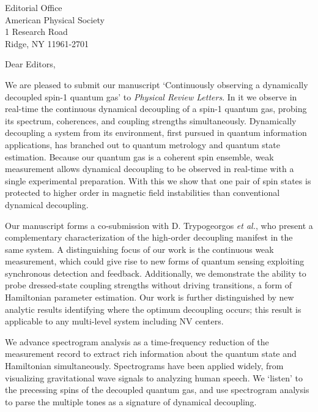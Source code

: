 \documentclass[10pt,letterpaper]{letter} %
\begin{document}
\begin{letter}{
    Editorial Office\\
    American Physical Society\\
    1 Research Road \\
    Ridge, NY 11961-2701\\
}

\opening{Dear Editors,}

We are pleased to submit our manuscript `Continuously observing a dynamically decoupled spin-1 quantum gas' to \textit{Physical Review Letters}.
In it we observe in real-time the continuous dynamical decoupling of a spin-1 quantum gas, probing its spectrum, coherences, and coupling strengths simultaneously.
Dynamically decoupling a system from its environment, first pursued in quantum information applications, has branched out to quantum metrology and quantum state estimation.
Because our quantum gas is a coherent spin ensemble, weak measurement allows dynamical decoupling to be observed in real-time with a single experimental preparation.
With this we show that one pair of spin states is protected to higher order in magnetic field instabilities than conventional dynamical decoupling.  

Our manuscript forms a co-submission with D. Trypogeorgos \textit{et al.}, who present a complementary characterization of the high-order decoupling manifest in the same system.
A distinguishing focus of our work is the continuous weak measurement, which could give rise to new forms of quantum sensing exploiting synchronous detection and feedback.
Additionally, we demonstrate the ability to probe dressed-state coupling strengths without driving transitions, a form of Hamiltonian parameter estimation.
Our work is further distinguished by new analytic results identifying where the optimum decoupling occurs; this result is applicable to any multi-level system including NV centers.

We advance spectrogram analysis as a time-frequency reduction of the measurement record to extract rich information about the quantum state and Hamiltonian simultaneously.
Spectrograms have been applied widely, from visualizing gravitational wave signals to analyzing human speech.
We `listen' to the precessing spins of the decoupled quantum gas, and use spectrogram analysis to parse the multiple tones as a signature of dynamical decoupling.


\end{letter}
\end{document}
